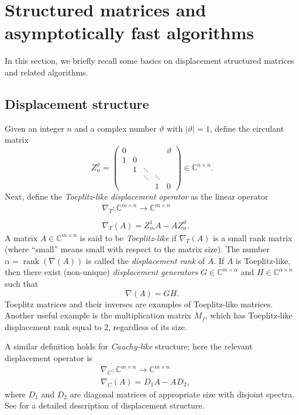 \documentclass{article}
\newcommand{\tmem}[1]{{\em #1\/}}
\newcommand{\tmop}[1]{\ensuremath{\operatorname{#1}}}
\begin{document}
\section{Structured matrices and asymptotically fast algorithms}



In this section, we briefly recall some basics on displacement structured
matrices and related algorithms.

\subsection{Displacement structure}

Given an integer $n$ and a complex number $\vartheta$ with $| \vartheta | =
1$, define the circulant matrix
\[ Z_{n^{}}^{\vartheta} = \left(\begin{array}{ccccc}
     0 &  &  &  & \vartheta\\
     1 & 0 &  &  & \\
     & 1 & \ddots &  & \\
     &  & \ddots & \ddots & \\
     &  &  & 1 & 0
   \end{array}\right) \in \mathbb{C}^{n \times n} . \]
Next, define the {\tmem{Toeplitz-like displacement operator}} as the linear
operator
\begin{eqnarray*}
  \nabla_T : \mathbb{C}^{m \times n} \longrightarrow \mathbb{C}^{m \times n}
  &  & \\
  &  & \\
  \nabla_T (A) = Z_m^1 A - A Z_n^{\vartheta} . &  & 
\end{eqnarray*}
A matrix $A \in \mathbb{C}^{m \times n}$ is said to be {\tmem{Toeplitz-like}}
if $\nabla_T (A)$ is a small rank matrix (where ``small'' means small with
respect to the matrix size). The number $\alpha = \tmop{rank} (\nabla (A))$ is
called the {\tmem{displacement rank}} of $A$. If $A$ is Toeplitz-like, then
there exist (non-unique) {\tmem{displacement generators}} $G \in
\mathbb{C}^{m \times \alpha}$ and $H \in \mathbb{C}^{\alpha \times n}$ such
that
\[ \nabla (A) = G H. \]
Toeplitz matrices and their inverses are examples of Toeplitz-like matrices.
Another useful example is the multiplication matrix $M_f$, which has
Toeplitz-like displacement rank equal to $2$, regardless of its size.

A similar definition holds for {\tmem{Cauchy-like}} structure; here the
relevant displacement operator is
\begin{eqnarray*}
  \nabla_C : \mathbb{C}^{m \times n} \longrightarrow \mathbb{C}^{m \times n}
  &  & \\
  \nabla_C (A) =^{} D_1 A - A^{} D_2, &  & 
\end{eqnarray*}
where $D_1$ and $D_2$ are diagonal matrices of appropriate size with disjoint
spectra. See {\cite{KS}} for a detailed description of displacement structure.
\end{document}
